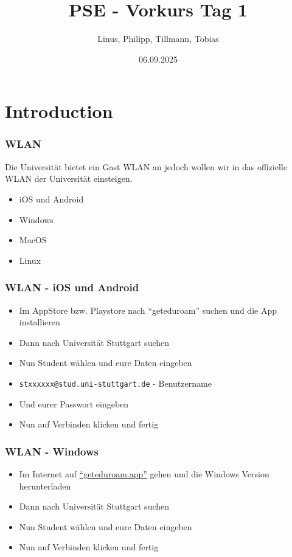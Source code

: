 \documentclass{../../presentation}
\title{PSE - Vorkurs Tag 1}
\author{Linus, Philipp, Tillmann, Tobias}
\institute{FIUS - Fachgruppe Informatik Universität Stuttgart}
\date{06.09.2025}
\begin{document}
\begin{frame}
  \titlepage
\end{frame}

\begin{frame}
  \listoftodos
\end{frame}

\section{Introduction}

\begin{frame}
\end{frame}

\begin{frame}[fragile]
  \frametitle{WLAN}
  Die Universität bietet ein Gast WLAN an jedoch wollen wir in das offizielle WLAN der Universität einsteigen.
  \newline
  \begin{itemize}
    \item iOS und Android
    \item Windows
    \item MacOS
    \item Linux
  \end{itemize}
\end{frame}

\begin{frame}[fragile]
  \frametitle{WLAN - iOS und Android}
  \begin{itemize}
    \item Im AppStore bzw. Playstore nach \enquote{geteduroam} suchen und die App installieren
    \item Dann nach Universität Stuttgart suchen
    \item Nun Student wählen und eure Daten eingeben
    \item \texttt{stxxxxxx@stud.uni-stuttgart.de} - Benutzername
    \item Und eurer Passwort eingeben
    \item Nun auf Verbinden klicken und fertig
  \end{itemize}
\end{frame}

\begin{frame}[fragile]
  \frametitle{WLAN - Windows}
  \begin{itemize}
    \item Im Internet auf \href{https://geteduroam.app}{\enquote{geteduroam.app}} gehen und die Windows Version herunterladen
    \item Dann nach Universität Stuttgart suchen
    \item Nun Student wählen und eure Daten eingeben
    \item Nun auf Verbinden klicken und fertig
  \end{itemize}
\end{frame}
\end{document}
